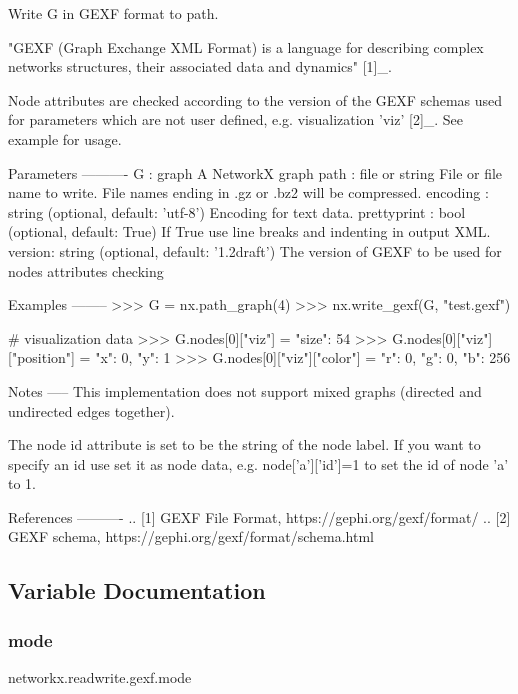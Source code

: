 \begin{DoxyVerb}Write G in GEXF format to path.

"GEXF (Graph Exchange XML Format) is a language for describing
complex networks structures, their associated data and dynamics" [1]_.

Node attributes are checked according to the version of the GEXF
schemas used for parameters which are not user defined,
e.g. visualization 'viz' [2]_. See example for usage.

Parameters
----------
G : graph
   A NetworkX graph
path : file or string
   File or file name to write.
   File names ending in .gz or .bz2 will be compressed.
encoding : string (optional, default: 'utf-8')
   Encoding for text data.
prettyprint : bool (optional, default: True)
   If True use line breaks and indenting in output XML.
version: string (optional, default: '1.2draft')
   The version of GEXF to be used for nodes attributes checking

Examples
--------
>>> G = nx.path_graph(4)
>>> nx.write_gexf(G, "test.gexf")

# visualization data
>>> G.nodes[0]["viz"] = {"size": 54}
>>> G.nodes[0]["viz"]["position"] = {"x": 0, "y": 1}
>>> G.nodes[0]["viz"]["color"] = {"r": 0, "g": 0, "b": 256}


Notes
-----
This implementation does not support mixed graphs (directed and undirected
edges together).

The node id attribute is set to be the string of the node label.
If you want to specify an id use set it as node data, e.g.
node['a']['id']=1 to set the id of node 'a' to 1.

References
----------
.. [1] GEXF File Format, https://gephi.org/gexf/format/
.. [2] GEXF schema, https://gephi.org/gexf/format/schema.html
\end{DoxyVerb}
 

\subsection{Variable Documentation}
\mbox{\label{namespacenetworkx_1_1readwrite_1_1gexf_ac603c971d93c75cffd74249147f7b532}} 
\subsubsection{\texorpdfstring{mode}{mode}}
{\footnotesize\ttfamily networkx.\+readwrite.\+gexf.\+mode}


